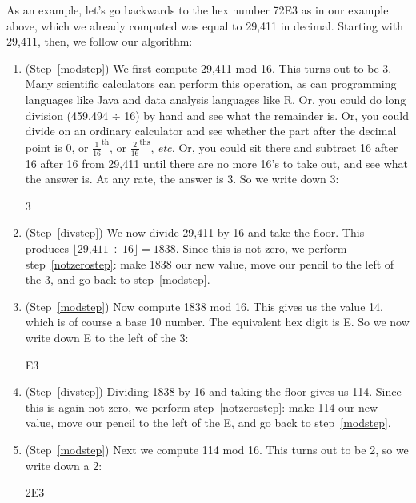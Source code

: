 As an example, let's go backwards to the hex number 72E3 as in our example
above, which we already computed was equal to 29,411 in decimal. Starting
with 29,411, then, we follow our algorithm:

\begin{enumerate}

\item (Step~\ref{modstep}) We first compute 29,411 mod 16. This turns out
to be 3. Many scientific calculators can perform this operation, as can
programming languages like Java and data analysis languages like R. Or, you
could do long division (459,494 $\div$ 16) by hand and see what the
remainder is. Or, you could divide on an ordinary calculator and see
whether the part after the decimal point is 0, or $\frac{1}{16}^\text{th}$,
or $\frac{2}{16}^\text{ths}$, \textit{etc.} Or, you could sit there and
subtract 16 after 16 after 16 from 29,411 until there are no more 16's to
take out, and see what the answer is. At any rate, the answer is 3. So we
write down 3:

{\Large
\begin{center}
3
\end{center}
}

\item (Step~\ref{divstep}) We now divide 29,411 by 16 and take the floor.
This produces $\lfloor \text{29,411} \div 16 \rfloor = 1838$. Since this is
not zero, we perform step~\ref{notzerostep}: make 1838 our new value, move
our pencil to the left of the 3, and go back to step~\ref{modstep}.

\item (Step~\ref{modstep}) Now compute 1838 mod 16. This gives us the value
14, which is of course a base 10 number. The equivalent hex digit is E. So
we now write down E to the left of the 3:

{\Large
\begin{center}
E3
\end{center}
}

\item (Step~\ref{divstep}) Dividing 1838 by 16 and taking the floor gives
us 114. Since this is again not zero, we perform step~\ref{notzerostep}:
make 114 our new value, move our pencil to the left of the E, and go back
to step~\ref{modstep}.

\item (Step~\ref{modstep}) Next we compute 114 mod 16. This turns out to be
2, so we write down a 2:

{\Large
\begin{center}
2E3
\end{center}
}


\end{enumerate}
